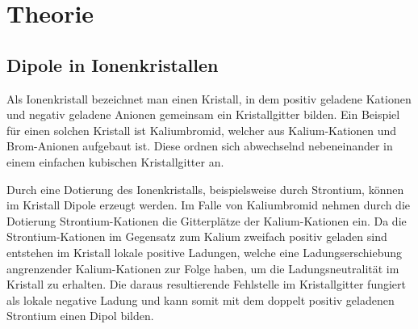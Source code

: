 
\section{Theorie}
\label{sec:Theorie}
\subsection{Dipole in Ionenkristallen}
Als Ionenkristall bezeichnet man einen Kristall, in dem positiv geladene Kationen und negativ geladene Anionen gemeinsam ein Kristallgitter bilden. Ein Beispiel für einen solchen Kristall ist Kaliumbromid, welcher aus Kalium-Kationen und Brom-Anionen aufgebaut ist. Diese ordnen sich abwechselnd nebeneinander in einem einfachen kubischen Kristallgitter an. 

Durch eine Dotierung des Ionenkristalls, beispielsweise durch Strontium, können im Kristall Dipole erzeugt werden. Im Falle von Kaliumbromid nehmen durch die Dotierung Strontium-Kationen die Gitterplätze der Kalium-Kationen ein.
Da die Strontium-Kationen im Gegensatz zum Kalium zweifach positiv geladen sind entstehen im Kristall lokale positive Ladungen, welche eine Ladungserschiebung angrenzender Kalium-Kationen zur Folge haben, um die Ladungsneutralität im Kristall zu erhalten. Die daraus resultierende Fehlstelle im Kristallgitter fungiert als lokale negative Ladung und kann somit mit dem doppelt positiv geladenen Strontium einen Dipol bilden. 

